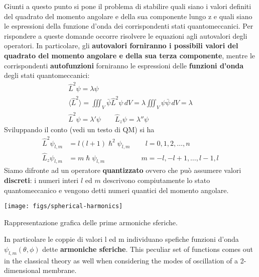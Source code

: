 Giunti a questo punto si pone il problema di stabilire quali siano i
valori definiti del quadrato del momento angolare e della sua componente
lungo z e quali siano le espressioni della funzione d'onda dei
corrispondenti stati quantomeccanici.
Per rispondere a queste domande
occorre risolvere le equazioni agli autovalori degli operatori.
In
particolare, gli \textbf{autovalori forniranno i possibili valori del
quadrato del momento angolare e della sua terza componente}, mentre le
corrispondenti \textbf{autofunzioni} forniranno le espressioni delle
\textbf{funzioni d'onda} degli stati quantomeccanici: \begin{gather*}
                                                          \hat{L}^{2}\psi = \lambda \psi\\
                                                          \langle \hat{L}^{2}\rangle = \iiint_{V} \bar{\psi} \hat{L}^{2}\psi \, dV = \lambda \iiint_{V} \psi \bar{\psi} \, dV = \lambda\\
                                                          \hat{L}^{2} \psi = \lambda' \psi \qquad  \hat{L}_{z} \psi = \lambda'' \psi
\end{gather*}
Sviluppando il conto (vedi un testo di QM) si ha
\begin{align*}
    \hat{L}^{2}\psi_{l,m} &= l(l+1) \hslash^{2} \psi_{l,m} \qquad  \, l = 0,1,2, \dots , n\\
    \hat{L}_{z} \psi_{l,m} &= m \hslash \psi_{l,m} \qquad  \qquad \quad \, m = -l,-l + 1, \dots ,l-1, l
\end{align*} Siamo difronte ad un operatore \textbf{quantizzato} ovvero che può
assumere valori \textbf{discreti}: i numeri interi $l$ ed $m$ descrivono
compiutamente lo stato quantomeccanico e vengono detti numeri quantici
del momento angolare.\\
\begin{marginfigure}
    \texttt{[image: figs/spherical-harmonics]}
    \caption{Rappresentazione grafica delle prime armoniche sferiche.}
    \label{fig:spherical-harmonics}
\end{marginfigure}
In particolare le coppie di valori l ed m individuano spefiche funzioni
d'onda \(\psi_{l,m}(\theta,\phi)\) dette \textbf{armoniche sferiche}.
This peculiar set of functions comes out in the classical theory as well
when considering the modes of oscillation of a 2-dimensional membrane.
\marginnote
